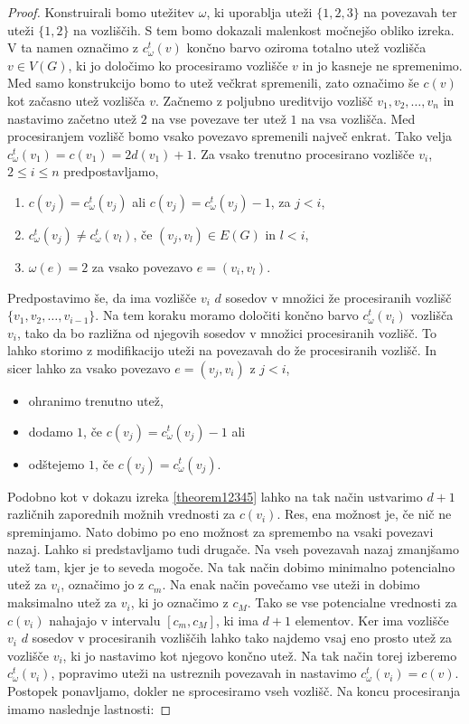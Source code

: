 \documentclass[12pt,a4paper,twoside]{article}
\theoremstyle{definition} %
\theoremstyle{plain} %
\numberwithin{equation}{section}  %
\begin{document}
\begin{proof}
Konstruirali bomo utežitev $\omega$, ki uporablja uteži $\{1,2,3\}$ na povezavah ter uteži $\{1,2\}$ na vozliščih. S tem bomo dokazali malenkost močnejšo obliko izreka. V ta namen označimo z $c_{\omega}^t(v)$ končno barvo oziroma totalno utež vozlišča $v \in V(G)$, ki jo določimo ko procesiramo vozlišče $v$ in jo kasneje ne spremenimo. Med samo konstrukcijo bomo to utež večkrat spremenili, zato označimo še $c(v)$ kot začasno utež vozlišča $v$. Začnemo z poljubno ureditvijo vozlišč $v_1, v_2, \ldots, v_n$ in nastavimo začetno utež $2$ na vse povezave ter utež $1$ na vsa vozlišča. Med procesiranjem vozlišč bomo vsako povezavo spremenili največ enkrat. Tako velja $c_{\omega}^t(v_1) = c(v_1) = 2d(v_1) + 1$. Za vsako trenutno procesirano vozlišče $v_i$, $2\le i \le n$ predpostavljamo,
\begin{enumerate}
\item $c(v_j) = c_{\omega}^t(v_j) $ ali $c(v_j) = c_{\omega}^t(v_j)  - 1$, za $j < i$,
\item $c_{\omega}^t(v_j) \neq c_{\omega}^t(v_l)$, če $(v_j,v_l) \in E(G)$ in $l < i$,
\item $\omega(e) = 2$ za vsako povezavo $e = (v_i, v_l)$.
\end{enumerate}
Predpostavimo še, da ima vozlišče $v_i$ $d$ sosedov v množici že procesiranih vozlišč $\{v_1, v_2, \ldots, v_{i-1}\}$. Na tem koraku moramo določiti končno barvo $c_{\omega}^t(v_i)$ vozlišča $v_i$, tako da bo razližna od njegovih sosedov v množici procesiranih vozlišč. To lahko storimo z modifikacijo uteži na povezavah do že procesiranih vozlišč. In sicer lahko za vsako povezavo $e = (v_j, v_i)$ z $j < i$,
\begin{itemize}
\item ohranimo trenutno utež,
\item dodamo $1$, če $c(v_j) = c_{\omega}^t(v_j)   - 1$ ali
\item odštejemo $1$, če $c(v_j) = c_{\omega}^t(v_j) $.
\end{itemize}
Podobno kot v dokazu izreka \ref{theorem12345} lahko na tak način ustvarimo $d+1$ različnih zaporednih možnih vrednosti za $c(v_i)$. Res, ena možnost je, če nič ne spreminjamo. Nato dobimo po eno možnost za spremembo na vsaki povezavi nazaj. Lahko si predstavljamo tudi drugače. Na vseh povezavah nazaj zmanjšamo utež tam, kjer je to seveda mogoče. Na tak način dobimo minimalno potencialno utež za $v_i$, označimo jo z  $c_m$. Na enak način povečamo vse uteži in dobimo maksimalno utež za $v_i$, ki jo označimo z $c_M$. Tako se vse potencialne vrednosti za $c(v_i)$ nahajajo v intervalu $[c_m, c_M]$, ki ima $d+1$ elementov. Ker ima vozlišče $v_i$ $d$ sosedov v procesiranih vozliščih lahko tako najdemo vsaj eno prosto utež za vozlišče $v_i$, ki jo nastavimo kot njegovo končno utež. Na tak način torej izberemo $c_{\omega}^t(v_i)$, popravimo uteži na ustreznih povezavah in nastavimo $c_{\omega}^t(v_i) = c(v)$. Postopek ponavljamo, dokler ne sprocesiramo vseh vozlišč. Na koncu procesiranja imamo naslednje lastnosti:

\end{proof}
\end{document}
